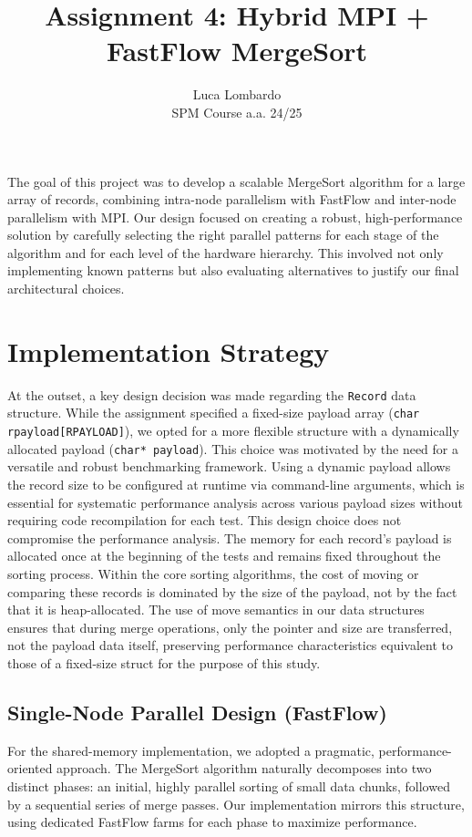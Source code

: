 \documentclass[10pt]{article}
\title{Assignment 4: Hybrid MPI + FastFlow MergeSort}
\author{Luca Lombardo \\ SPM Course a.a. 24/25}
\date{}
\newcommand{\code}[1]{\texttt{#1}}
\begin{document}
\maketitle
\vspace{-1.5em} %


The goal of this project was to develop a scalable MergeSort algorithm for a large array of records, combining intra-node parallelism with FastFlow and inter-node parallelism with MPI. Our design focused on creating a robust, high-performance solution by carefully selecting the right parallel patterns for each stage of the algorithm and for each level of the hardware hierarchy. This involved not only implementing known patterns but also evaluating alternatives to justify our final architectural choices.
\section{Implementation Strategy}

At the outset, a key design decision was made regarding the \code{Record} data structure. While the assignment specified a fixed-size payload array (\code{char rpayload[RPAYLOAD]}), we opted for a more flexible structure with a dynamically allocated payload (\code{char* payload}). This choice was motivated by the need for a versatile and robust benchmarking framework. Using a dynamic payload allows the record size to be configured at runtime via command-line arguments, which is essential for systematic performance analysis across various payload sizes without requiring code recompilation for each test. This design choice does not compromise the performance analysis. The memory for each record's payload is allocated once at the beginning of the tests and remains fixed throughout the sorting process. Within the core sorting algorithms, the cost of moving or comparing these records is dominated by the size of the payload, not by the fact that it is heap-allocated. The use of move semantics in our data structures ensures that during merge operations, only the pointer and size are transferred, not the payload data itself, preserving performance characteristics equivalent to those of a fixed-size struct for the purpose of this study.



\subsection{Single-Node Parallel Design (FastFlow)}
For the shared-memory implementation, we adopted a pragmatic, performance-oriented approach. The MergeSort algorithm naturally decomposes into two distinct phases: an initial, highly parallel sorting of small data chunks, followed by a sequential series of merge passes. Our implementation mirrors this structure, using dedicated FastFlow farms for each phase to maximize performance.
\end{document}
